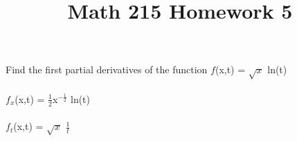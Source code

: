 \documentclass{article} %
\title{Math 215 Homework 5} %
\author{} %
\date{} %
\begin{document}
    \maketitle %
    Find the first partial derivatives of the function $f$(x,t) = $\sqrt{x}$ ln(t)\\\\
    $f_x$(x,t) = $\frac{1}{2}$x$^{-\frac{1}{2}}$ ln(t)\\\\
    $f_t$(x,t) = $\sqrt{x}$ $\frac{1}{t}$
\end{document}

